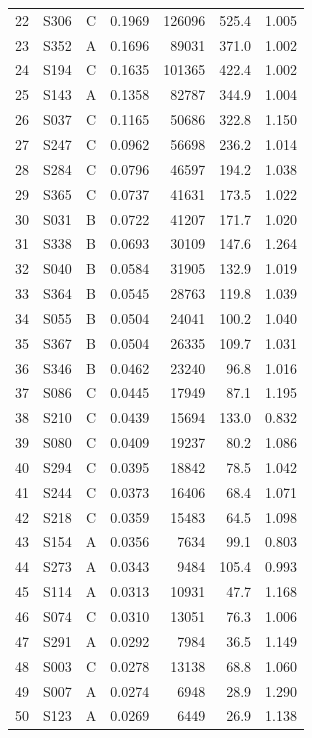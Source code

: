 \documentclass[12pt,a4paper]{ctexart}
\begin{document}
\begin{longtable}{clccrrr}
22 & S306 & C & 0.1969 & 126096 & 525.4 & 1.005 \\
23 & S352 & A & 0.1696 & 89031 & 371.0 & 1.002 \\
24 & S194 & C & 0.1635 & 101365 & 422.4 & 1.002 \\
25 & S143 & A & 0.1358 & 82787 & 344.9 & 1.004 \\
26 & S037 & C & 0.1165 & 50686 & 322.8 & 1.150 \\
27 & S247 & C & 0.0962 & 56698 & 236.2 & 1.014 \\
28 & S284 & C & 0.0796 & 46597 & 194.2 & 1.038 \\
29 & S365 & C & 0.0737 & 41631 & 173.5 & 1.022 \\
30 & S031 & B & 0.0722 & 41207 & 171.7 & 1.020 \\
31 & S338 & B & 0.0693 & 30109 & 147.6 & 1.264 \\
32 & S040 & B & 0.0584 & 31905 & 132.9 & 1.019 \\
33 & S364 & B & 0.0545 & 28763 & 119.8 & 1.039 \\
34 & S055 & B & 0.0504 & 24041 & 100.2 & 1.040 \\
35 & S367 & B & 0.0504 & 26335 & 109.7 & 1.031 \\
36 & S346 & B & 0.0462 & 23240 & 96.8 & 1.016 \\
37 & S086 & C & 0.0445 & 17949 & 87.1 & 1.195 \\
38 & S210 & C & 0.0439 & 15694 & 133.0 & 0.832 \\
39 & S080 & C & 0.0409 & 19237 & 80.2 & 1.086 \\
40 & S294 & C & 0.0395 & 18842 & 78.5 & 1.042 \\
41 & S244 & C & 0.0373 & 16406 & 68.4 & 1.071 \\
42 & S218 & C & 0.0359 & 15483 & 64.5 & 1.098 \\
43 & S154 & A & 0.0356 & 7634 & 99.1 & 0.803 \\
44 & S273 & A & 0.0343 & 9484 & 105.4 & 0.993 \\
45 & S114 & A & 0.0313 & 10931 & 47.7 & 1.168 \\
46 & S074 & C & 0.0310 & 13051 & 76.3 & 1.006 \\
47 & S291 & A & 0.0292 & 7984 & 36.5 & 1.149 \\
48 & S003 & C & 0.0278 & 13138 & 68.8 & 1.060 \\
49 & S007 & A & 0.0274 & 6948 & 28.9 & 1.290 \\
50 & S123 & A & 0.0269 & 6449 & 26.9 & 1.138 \\
\end{longtable}
\end{document}
